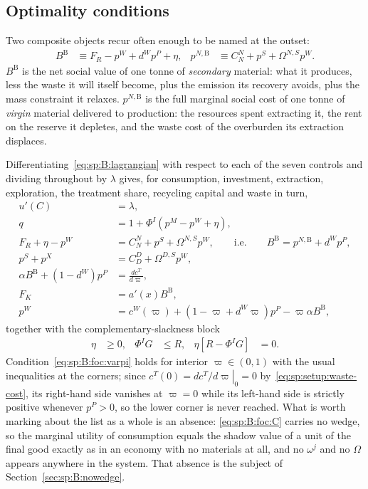 \subsection{Optimality conditions}\label{sec:sp:B:foc}\label{sec:sp:B:costates}

Two composite objects recur often enough to be named at the outset:
\begin{align}
B^{\mathrm B} &\equiv F_R-p^W+d^Wp^P+\eta,
&
p^{N,\mathrm B} &\equiv C^N_N+p^S+\Omega^{N,S}p^W .
\label{eq:sp:B:Bvalue}
\end{align}
$B^{\mathrm B}$ is the net social value of one tonne of \emph{secondary} material: what it produces, less
the waste it will itself become, plus the emission its recovery avoids, plus the mass constraint it
relaxes. $p^{N,\mathrm B}$ is the full marginal social cost of one tonne of \emph{virgin} material
delivered to production: the resources spent extracting it, the rent on the reserve it depletes, and
the waste cost of the overburden its extraction displaces.

 Differentiating~\eqref{eq:sp:B:lagrangian} with respect to each of the seven
controls and dividing throughout by $\lambda$ gives, for consumption, investment, extraction,
exploration, the treatment share, recycling capital and waste in turn,
\begin{align}
u'\!\left(C\right) &= \lambda,
\label{eq:sp:B:foc:C}
\\[0.15em]
q &= 1+\Phi^I\left(p^M-p^W+\eta\right),
\label{eq:sp:B:foc:I}
\\[0.15em]
F_R+\eta-p^W &= C^N_N+p^S+\Omega^{N,S}p^W,
\qquad\text{i.e.}\qquad
B^{\mathrm B} = p^{N,\mathrm B}+d^Wp^P,
\label{eq:sp:B:foc:N}
\\[0.15em]
p^S+p^X &= C^D_D+\Omega^{D,S}p^W,
\label{eq:sp:B:foc:D}
\\[0.15em]
\alpha B^{\mathrm B}+\left(1-d^W\right)p^P &= \frac{dc^T}{d\varpi},
\label{eq:sp:B:foc:varpi}
\\[0.15em]
F_K &= a'\!\left(x\right)B^{\mathrm B},
\label{eq:sp:B:foc:KR}
\\[0.15em]
p^W &= c^W\!\left(\varpi\right)+\left(1-\varpi+d^W\varpi\right)p^P-\varpi\alpha B^{\mathrm B},
\label{eq:sp:B:foc:W}
\end{align}
together with the complementary-slackness block
\begin{align}
\eta &\ge0,
&
\Phi^IG &\le R,
&
\eta\left[R-\Phi^IG\right] &= 0 .
\label{eq:sp:B:foc:cs}
\end{align}
Condition~\eqref{eq:sp:B:foc:varpi} holds for interior $\varpi\in\left(0,1\right)$ with the usual
inequalities at the corners; since $c^T(0)=\left.dc^T/d\varpi\right|_{0}=0$
by~\eqref{eq:sp:setup:waste-cost}, its right-hand side vanishes at $\varpi=0$ while its left-hand side
is strictly positive whenever $p^P>0$, so the lower corner is never reached. What is worth marking
about the list as a whole is an absence: \eqref{eq:sp:B:foc:C} carries no wedge, so the marginal
utility of consumption equals the shadow value of a unit of the final good exactly as in an economy
with no materials at all, and no $\omega^j$ and no $\Omega$ appears anywhere in the system. That
absence is the subject of Section~\ref{sec:sp:B:nowedge}.

